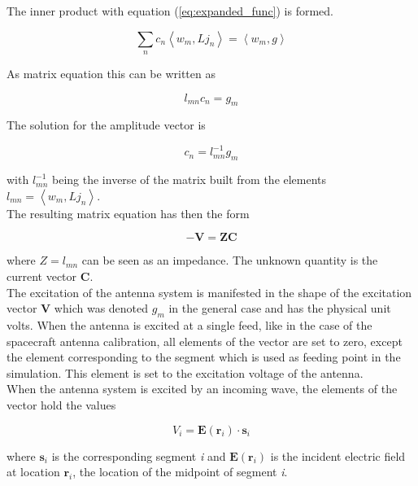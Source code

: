 \documentclass[a4paper,11pt]{report}
\begin{document}
The inner product with equation (\ref{eq:expanded_func}) is formed.

\begin{equation}
 \sum_{n} c_n \left\langle w_m, L j_n\right\rangle = \left\langle w_m, g \right\rangle
\end{equation}

As matrix equation this can be written as

\begin{equation}
 l_{mn}c_n=g_m
\end{equation}

The solution for the amplitude vector is

\begin{equation}
 c_n=l_{mn}^{-1}g_m
\end{equation}

with $l_{mn}^{-1}$ being the inverse of the matrix built from the elements $l_{mn}=\left\langle w_m, L j_n\right\rangle$.\\

The resulting matrix equation has then the form


\begin{equation}\label{eq:mom}
- \mathbf{V}=\mathbf{ZC}
\end{equation}

where $Z=l_{mn}$ can be seen as an impedance. The unknown quantity is the current vector $\mathbf{C}$. \\

The excitation of the antenna system is manifested in the shape of the excitation vector $\mathbf{V}$ which was denoted $g_m$ in the general case and has the physical unit volts. When the antenna is excited at a single feed, like in the case of the spacecraft antenna calibration, all elements of the vector are set to zero, except the element corresponding to the segment which is used as feeding point in the simulation. This element is set to the excitation voltage of the antenna.\\


When the antenna system is excited by an incoming wave, the elements of the vector hold the values

\begin{equation}
 V_i=\mathbf{E(r_\mathit{i})} \cdot \mathbf{s_\mathit{i}}
\end{equation}

where $\mathbf{s_\mathit{i}}$ is the corresponding segment \textit{i} and $\mathbf{E(r_\mathit{i})}$ is the incident electric field at location $\mathbf{r}_\mathit{i}$, the location of the midpoint of segment \textit{i}.
\end{document}
